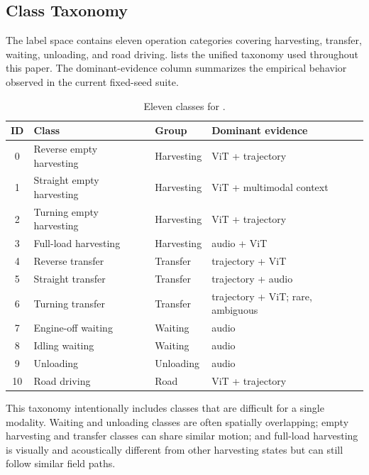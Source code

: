 \subsection{Class Taxonomy}

The label space contains eleven operation categories covering harvesting, transfer, waiting, unloading, and road driving.  lists the unified taxonomy used throughout this paper. The dominant-evidence column summarizes the empirical behavior observed in the current fixed-seed suite.

\begin{table}[t]
\centering
\caption{Eleven classes for \task{}.}
\label{tab:classes}
\small
\begin{tabular}{clll}
\toprule
\textbf{ID} & \textbf{Class} & \textbf{Group} & \textbf{Dominant evidence} \\
\midrule
0  & Reverse empty harvesting  & Harvesting & ViT + trajectory \\
1  & Straight empty harvesting & Harvesting & ViT + multimodal context \\
2  & Turning empty harvesting  & Harvesting & ViT + trajectory \\
3  & Full-load harvesting      & Harvesting & audio + ViT \\
4  & Reverse transfer          & Transfer   & trajectory + ViT \\
5  & Straight transfer         & Transfer   & trajectory + audio \\
6  & Turning transfer          & Transfer   & trajectory + ViT; rare, ambiguous \\
7  & Engine-off waiting        & Waiting    & audio \\
8  & Idling waiting            & Waiting    & audio \\
9  & Unloading                 & Unloading  & audio \\
10 & Road driving              & Road       & ViT + trajectory \\
\bottomrule
\end{tabular}
\end{table}

This taxonomy intentionally includes classes that are difficult for a single modality. Waiting and unloading classes are often spatially overlapping; empty harvesting and transfer classes can share similar motion; and full-load harvesting is visually and acoustically different from other harvesting states but can still follow similar field paths.


